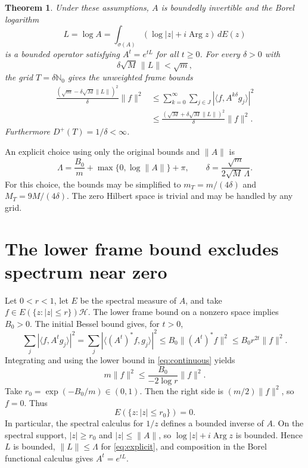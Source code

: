 \documentclass[11pt]{article}
\newtheorem{theorem}{Theorem}
\newcommand{\HH}{\mathcal H}
\newcommand{\NN}{\mathbb N}
\DeclareMathOperator{\Arg}{Arg}
\begin{document}
\begin{theorem}\label{thm:main}
Under these assumptions, $A$ is boundedly invertible and the Borel logarithm
\[
L=\log A=\int_{\sigma(A)}(\log|z|+i\Arg z)\,dE(z)
\]
is a bounded operator satisfying $A^t=e^{tL}$ for all $t\geq0$. For every $\delta>0$ with
\begin{equation}\label{eq:delta}
\delta\sqrt M\,\|L\|<\sqrt m,
\end{equation}
the grid $T=\delta\NN_0$ gives the unweighted frame bounds
\begin{equation}\label{eq:bounds}
\begin{split}
\frac{(\sqrt m-\delta\sqrt M\|L\|)^2}{\delta}\|f\|^2
&\leq\sum_{k=0}^\infty\sum_{j\in J}|\langle f,A^{k\delta}g_j\rangle|^2\\
&\leq\frac{(\sqrt M+\delta\sqrt M\|L\|)^2}{\delta}\|f\|^2.
\end{split}
\end{equation}
Furthermore $D^+(T)=1/\delta<\infty$.
\end{theorem}
An explicit choice using only the original bounds and $\|A\|$ is
\begin{equation}\label{eq:explicit}
\Lambda=\frac{B_0}{m}+\max\{0,\log\|A\|\}+\pi,
\qquad \delta=\frac{\sqrt m}{2\sqrt M\,\Lambda}.
\end{equation}
For this choice, the bounds may be simplified to $m_T=m/(4\delta)$ and $M_T=9M/(4\delta)$. The zero Hilbert space is trivial and may be handled by any grid.

\section{The lower frame bound excludes spectrum near zero}
Let $0<r<1$, let $E$ be the spectral measure of $A$, and take
$f\in E(\{z:|z|\leq r\})\HH$. The lower frame bound on a nonzero space implies $B_0>0$. The initial Bessel bound gives, for $t>0$,
\[
\sum_j|\langle f,A^tg_j\rangle|^2
=\sum_j|\langle (A^t)^*f,g_j\rangle|^2
\leq B_0\|(A^t)^*f\|^2\leq B_0r^{2t}\|f\|^2.
\]
Integrating and using the lower bound in \eqref{eq:continuous} yields
\begin{equation}\label{eq:spectral-gap}
m\|f\|^2\leq\frac{B_0}{-2\log r}\|f\|^2.
\end{equation}
Take $r_0=\exp(-B_0/m)\in(0,1)$. Then the right side is $(m/2)\|f\|^2$, so $f=0$. Thus
\[
E(\{z:|z|\leq r_0\})=0.
\]
In particular, the spectral calculus for $1/z$ defines a bounded inverse of $A$. On the spectral support, $|z|\geq r_0$ and $|z|\leq\|A\|$, so $\log|z|+i\Arg z$ is bounded. Hence $L$ is bounded, $\|L\|\leq\Lambda$ for \eqref{eq:explicit}, and composition in the Borel functional calculus gives $A^t=e^{tL}$.
\end{document}
